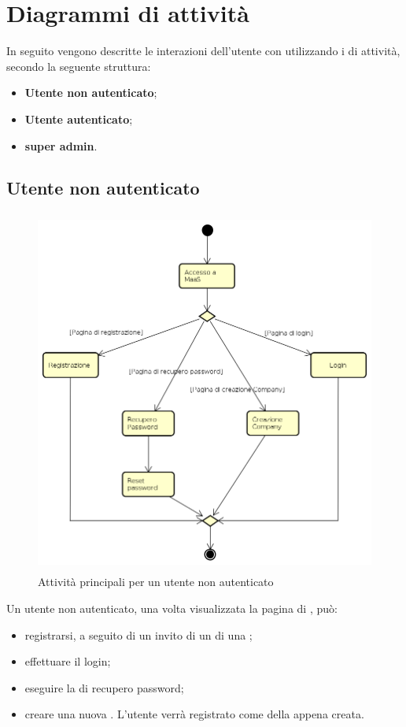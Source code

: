 \section{Diagrammi di attività}
In seguito vengono descritte le interazioni dell'utente con  utilizzando i  di attività, secondo la seguente struttura:
\begin{itemize}
\item \textbf{Utente non autenticato};
\item \textbf{Utente autenticato};
\item \textbf{super admin}.
\end{itemize}
\subsection{Utente non autenticato}
\begin{figure}[H]
\begin{center}
\includegraphics[height=12cm]{res/sections/backend/activities/principaliSenzaAuth.png}
\caption{Attività principali per un utente non autenticato}
\end{center}
\end{figure}
Un utente non autenticato, una volta visualizzata la pagina di , può:
\begin{itemize}
\item registrarsi, a seguito di un invito di un  di una ;
\item effettuare il login;
\item eseguire la  di recupero password;
\item creare una nuova . L'utente verrà registrato come  della  appena creata.
\end{itemize}
